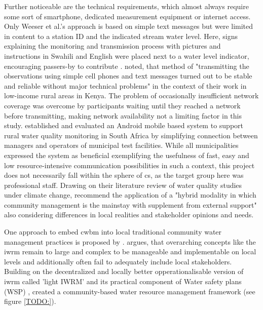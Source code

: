 {Further noticeable are the technical requirements, which almost always require some sort of smartphone, dedicated measurement equipment or internet access. Only Weeser et al.'s approach is based on simple text messages but were limited in content to a station ID and the indicated stream water level. Here, signs explaining the monitoring and transmission process with pictures and instructions in Swahili and English were placed next to a water level indicator, encouraging passers-by to contribute \autocite{weeserCitizenSciencePioneers2018a}. \autocite[1597]{weeserCitizenSciencePioneers2018a} noted, that method of "transmitting the observations using simple cell phones and text messages turned out to be stable and reliable without major technical problems" in the context of their work in low-income rural areas in Kenya. The problem of occasionally insufficient network coverage was overcome by participants waiting until they reached a network before transmitting, making network availability not a limiting factor in this study. \autocite{wilson-jonesUsingMobilePhones2012} established and evaluated an Android mobile based system to support rural water quality monitoring in South Africa by simplifying connection between managers and operators of municipal test facilities. While all municipalities expressed the system as beneficial exemplifying the usefulness of fast, easy and low resource-intensive communication possibilities in such a context, this project does not necessarily fall within the sphere of \acrshort*{cs}, as the target group here was professional staff. Drawing on their literature review of water quality studies under climate change, \autocite[147]{huangManagementDrinkingWater2020} recommend the application of a "hybrid modality in which community management is the mainstay with supplement from external support" also considering differences in local realities and stakeholder opinions and needs. 

One approach to embed \acrshort*{cwbm} into local traditional community water management practices is proposed by \autocite{dayCommunitybasedWaterResources2009}. \autocite{dayCommunitybasedWaterResources2009} argues, that overarching concepts like the \acrfull*{iwrm} remain to large and complex to be manageable and implementable on local levels and additionally often fail to adequately include local stakeholders. Building on the decentralized and locally better opperationalisable version of \acrshort*{iwrm} called 'light IWRM' \autocite{butterworthFindingPracticalApproaches2010,moriartyIntegratedWaterResources2004} and its practical component of Water safety plans (WSP) \autocite{bartramWaterSafetyPlan2009}, \autocite{dayCommunitybasedWaterResources2009} created a community-based water resource management framework (see figure \ref*{TODO:}). 

}
